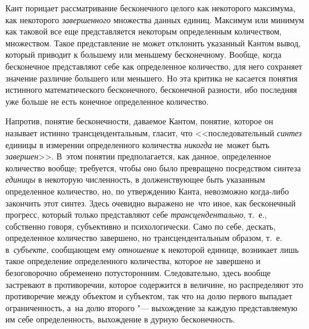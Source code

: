 Кант порицает рассматривание бесконечного целого как некоторого максимума, как
некоторого {\em завершенного} множества данных единиц. Максимум или минимум как
таковой все еще представляется некоторым определенным количеством, множеством.
Такое представление не может отклонить указанный Кантом вывод, который приводит
к большему или меньшему бесконечному. Вообще, когда бесконечное представляют
себе как определенное количество, для него сохраняет значение различие большего
или меньшего. Но эта критика не касается понятия истинного математического
бесконечного, бесконечной разности, ибо последняя уже больше не есть конечное
определенное количество.

Напротив, понятие бесконечности, даваемое Кантом, понятие, которое он называет
истинно трансцендентальным, гласит, что <<последовательный {\em синтез} единицы
в измерении определенного количества {\em никогда} не~может быть
{\em завершен}>>. В~этом понятии предполагается, как данное, определенное
количество вообще; требуется, чтобы оно было превращено посредством синтеза
{\em единицы} в некоторую численность, в долженствующее быть указанным
определенное количество, но, по утверждению Канта, невозможно когда-либо
закончить этот синтез. Здесь очевидно выражено не~что иное, как бесконечный
прогресс, который только представляют себе {\em трансцендентально}, т.~е.,
собственно говоря, субъективно и психологически. Само по себе, дескать,
определенное количество завершено, но трансцендентальным образом, т.~е.
в~{\em субъекте}, сообщающем ему {\em отношение} к некоторой единице, возникает
лишь такое определение определенного количества, которое не завершено и
безоговорочно обременено потусторонним. Следовательно, здесь вообще застревают
в противоречии, которое содержится в величине, но распределяют это противоречие
между объектом и субъектом, так что на долю первого выпадает ограниченность,
а~на долю второго "--- выхождение за каждую представляемую им себе
определенность, выхождение в дурную бесконечность.

